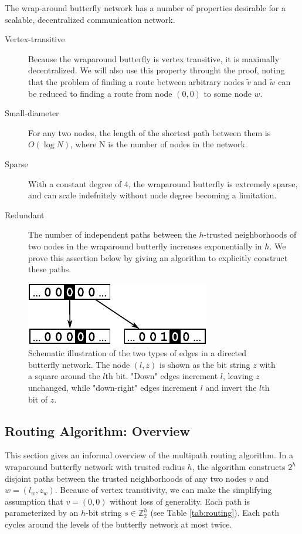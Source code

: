 \documentclass[prodmode,permissions]{acmsmall-ec16}
\begin{document}
The wrap-around butterfly network has a number of properties desirable for
a scalable, decentralized communication network.
\begin{description}
\item[Vertex-transitive]
Because the wraparound butterfly is vertex transitive,
it is maximally decentralized.
We will also use this property throught the proof, noting that
the problem of finding a route between arbitrary nodes $\tilde{v}$ and $\tilde{w}$
can be reduced to finding a route from node $(0,0)$ to some node $w$.
\item[Small-diameter]
For any two nodes, the length of the shortest path between them is
$O(\log N)$, where N is the number of nodes in the network.
\item[Sparse]
With a constant degree of 4, the wraparound butterfly is extremely sparse,
and can scale indefnitely without node degree becoming a limitation.
\item [Redundant] 
The number of independent paths between the $h$-trusted neighborhoods of two
nodes in the wraparound butterfly increases exponentially in $h$.
We prove this assertion below by giving an algorithm to explicitly construct
these paths.
\end{description}

\begin{figure}
\begin{center}
\includegraphics{fig-butterfly.pdf}
\end{center}
\caption{
Schematic illustration of the two types of edges in a directed butterfly network.
The node $(l,z)$ is shown as the bit string $z$ with a square around the $l$th bit.
"Down" edges increment $l$, leaving $z$ unchanged, while "down-right" edges
increment $l$ and invert the $l$th bit of $z$.
\label{fig:butterfly}
}
\end{figure}

\subsection{Routing Algorithm: Overview}

This section gives an informal overview of the multipath routing algorithm.
In a wraparound butterfly network with trusted radius $h$,
the algorithm constructs $2^h$ disjoint paths between the trusted neighborhoods
of any two nodes $v$ and $w = (l_w, z_w)$.
Because of vertex transitivity,
we can make the simplifying assumption that $v = (0,0)$ without loss of generality.
Each path is parameterized by an $h$-bit string $s \in \mathbb{Z}_2^h$ (see Table \ref{tab:routing}).
Each path cycles around the levels of the butterfly network at most twice.
\end{document}
